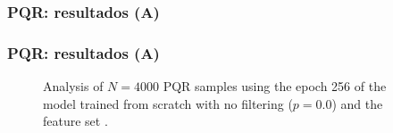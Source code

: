 \begin{frame}
\frametitle{PQR: resultados (A)}
\begin{figure}[H]
\centering
{}
\end{figure}
\end{frame}


\begin{frame}
\frametitle{PQR: resultados (A)}
\begin{figure}[H]
\centering
{}
\caption{Analysis of $N=4000$ PQR samples using the epoch 256 of the model trained from scratch with no filtering ($p=0.0$) and the feature set .}
\end{figure}
\end{frame}

